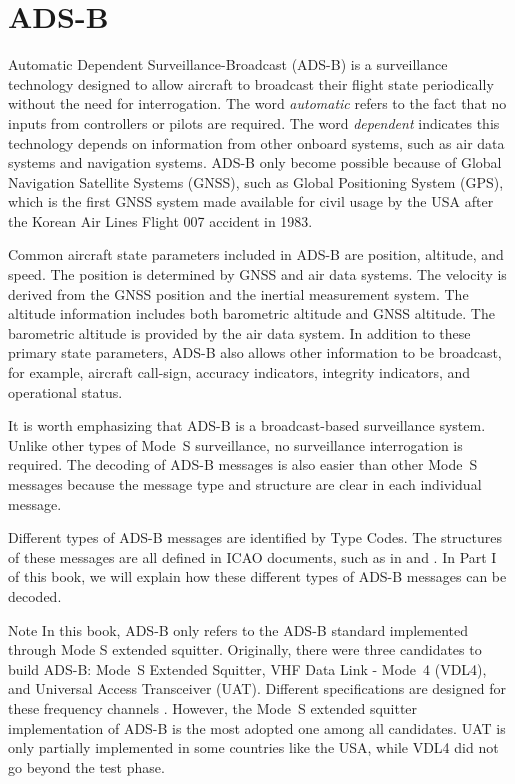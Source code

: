 \section{ADS-B}

Automatic Dependent Surveillance-Broadcast (ADS-B) is a surveillance technology designed to allow aircraft to broadcast their flight state periodically without the need for interrogation. The word \emph{automatic} refers to the fact that no inputs from controllers or pilots are required. The word \emph{dependent} indicates this technology depends on information from other onboard systems, such as air data systems and navigation systems. ADS-B only become possible because of Global Navigation Satellite Systems (GNSS), such as Global Positioning System (GPS), which is the first GNSS system made available for civil usage by the USA after the Korean Air Lines Flight 007 accident in 1983.

Common aircraft state parameters included in ADS-B are position, altitude, and speed. The position is determined by GNSS and air data systems. The velocity is derived from the GNSS position and the inertial measurement system. The altitude information includes both barometric altitude and GNSS altitude. The barometric altitude is provided by the air data system. In addition to these primary state parameters, ADS-B also allows other information to be broadcast, for example, aircraft call-sign, accuracy indicators, integrity indicators, and operational status.

It is worth emphasizing that ADS-B is a broadcast-based surveillance system. Unlike other types of Mode~S surveillance, no surveillance interrogation is required. The decoding of ADS-B messages is also easier than other Mode~S messages because the message type and structure are clear in each individual message.

Different types of ADS-B messages are identified by Type Codes. The structures of these messages are all defined in ICAO documents, such as in \cite{icao9871v1} and \cite{rtca2011mops}. In Part I of this book, we will explain how these different types of ADS-B messages can be decoded.

\begin{notebox}{Note}
  In this book, ADS-B only refers to the ADS-B standard implemented through Mode S extended squitter. Originally, there were three candidates to build ADS-B: Mode~S Extended Squitter, VHF Data Link - Mode~4 (VDL4), and Universal Access Transceiver (UAT). Different specifications are designed for these frequency channels \cite{rtca2011mops, rtca2002uat}. However, the Mode~S extended squitter implementation of ADS-B is the most adopted one among all candidates. UAT is only partially implemented in some countries like the USA, while VDL4 did not go beyond the test phase.
\end{notebox}


